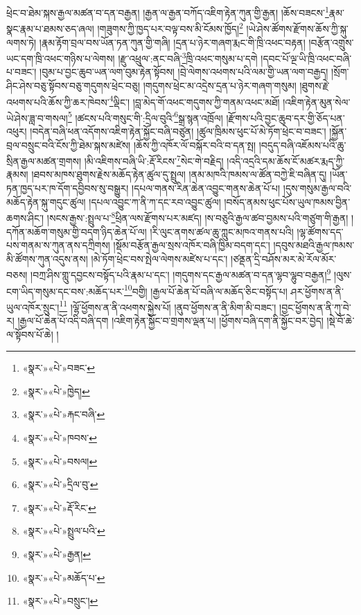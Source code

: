 ཕྲེང་བ་ཐེམ་སྐས་རྒྱལ་མཚན་བ་དན་བརྒྱན། །རྒྱན་ལ་རྒྱན་བཀོད་འཇིག་རྟེན་ཀུན་གྱི་རྒྱན། །ཆོས་བཟངས་\footnote{«སྣར་»«པེ་»བཟང་}རྣམ་སྣང་རྣམ་པ་ཐམས་ཅད་ཞལ། །གཟུགས་ཀྱི་ཁྱད་པར་བལྟ་བས་མི་ངོམས་ཁྱོད།\footnote{«སྣར་»«པེ་»ཁྱེད།} །ཡེ་ཤེས་ཚོགས་རྫོགས་ཆོས་ཀྱི་སྐུ་ལགས་ཏེ། །རྣམ་རྟོག་བྲལ་བས་ཡོན་ཏན་ཀུན་གྱི་གཞི། །དྲན་པ་ཉེར་གཞག་རྨང་གི་ཁྲི་འཕང་བརྟན། །བརྩོན་འགྲུས་ཡང་དག་ཁྲི་འཕང་གཉིས་པ་ལེགས། །རྫུ་འཕྲུལ་:ནང་བཞི་\footnote{«སྣར་»«པེ་»རྐང་བཞི་}ཁྲི་འཕང་གསུམ་པ་དགེ །དབང་པོ་ལྔ་ཡི་ཁྲི་འཕང་བཞི་པ་བཟང་། །བུམ་པ་བྱང་ཆུབ་ཡན་ལག་བུམ་རྟེན་སྟོབས། །བྲེ་ལེགས་འཕགས་པའི་ལམ་གྱི་ཡན་ལག་བརྒྱད། །སྲོག་ཤིང་ཤེས་བཅུ་སྟོབས་བཅུ་གདུགས་ཕྲེང་བཅུ། །གདུགས་ཕྲེང་མ་འདྲེས་དྲན་པ་ཉེར་གཞག་གསུམ། །ཐུགས་རྗེ་འཕགས་པའི་ཆོས་ཀྱི་ཆར་ཁེབས་\footnote{«སྣར་»«པེ་»ཁབས་}ལྡིང་། །བླ་མེད་གོ་འཕང་གདུགས་ཀྱི་གནམ་འཕང་མཐོ། །འཇིག་རྟེན་མུན་སེལ་ཡེ་ཤེས་ཟླ་བ་གསལ།\footnote{«སྣར་»«པེ་»བསལ།} །ཚངས་པའི་གསུང་གི་:དྲིལ་བུའི་\footnote{«སྣར་»«པེ་»དྲིལ་བུ་}སྒྲ་སྙན་འཁྲོལ། །རྫོགས་པའི་བྱང་ཆུབ་དར་གྱི་ཅོད་པན་འཕུར། །བདེན་བཞི་ཕན་འདོགས་འཇིག་རྟེན་སྐྱོང་བཞི་བཙུན། །ཚུལ་ཁྲིམས་ཕུང་པོ་མེ་ཏོག་ཕྲེང་བ་བཟང་། །སྐྱོན་བྲལ་བསྲུང་བའི་ངོས་ཀྱི་ཐེམ་སྐས་མཛེས། །ཆོས་ཀྱི་འཁོར་ལོ་བསྐོར་བའི་བ་དན་སྤ། །བདུད་བཞི་འཇོམས་པའི་ཆུ་སྲིན་རྒྱལ་མཚན་གྲགས། །མི་འཇིགས་བཞི་ཡི་:རྡོ་རིངས་\footnote{«སྣར་»«པེ་»རྡོ་རིང་}སེང་གེ་བརྗིད། །འདི་འདྲའི་དམ་ཆོས་ངོ་མཚར་རྨད་ཀྱི་རྣམས། །ཐབས་མཁས་ཐུགས་རྗེས་མཆོད་རྟེན་ཚུལ་དུ་སྤྲུལ། །ནམ་མཁའི་ཁམས་ལ་ཚོན་བཀྱེ་ཇི་བཞིན་དུ། །ཡོན་ཏན་ཁྱད་པར་ཁ་དོག་དབྱིབས་སུ་བསྒྱུར། །དཔལ་གནས་རིན་ཆེན་འབྱུང་གནས་ཆེན་པོ་པ། །དུས་གསུམ་རྒྱལ་བའི་མཆོད་རྟེན་སྐུ་གདུང་ཚུལ། །དཔལ་འབྱུང་ཀ་ནི་ཀ་དང་རབ་འབྱུང་ཚུལ། །བསོད་ནམས་ཕུང་པོས་ཡུལ་ཁམས་བྱིན་ཆགས་ཤིང་། །སངས་རྒྱས་:སྤྲུལ་པ་\footnote{«སྣར་»«པེ་»སྤྲུལ་པའི་}ཕྲིན་ལས་རྫོགས་པར་མཛད། །ས་བཅུའི་རྒྱལ་ཚབ་བྱམས་པའི་གཙུག་གི་རྒྱན། །དཀོན་མཆོག་གསུམ་གྱི་བདག་ཉིད་ཆེན་པོ་ལ། །རི་ལུང་ནགས་ཚལ་ཆུ་ཀླུང་མཁའ་གནས་པའི། །ལྷ་ཚོགས་དད་པས་གནམ་ས་ཀུན་ནས་དཀྲིགས། །སྡོམ་བརྩོན་རྒྱལ་སྲས་འཁོར་བཞི་ཁྱིམ་བདག་དང་། །དབུས་མཐའི་རྒྱལ་ཁམས་མི་ཚོགས་ཀུན་འདུས་ནས། །མེ་ཏོག་ཕྲེང་བས་སྤེལ་ལེགས་མཛེས་པ་དང་། །ཙནྡན་དྲི་བཤོས་མར་མེ་རོལ་མོར་བཅས། །བཀྲ་ཤིས་གླུ་དབྱངས་བསྟོད་པའི་རྣམ་པ་དང་། །གདུགས་དང་རྒྱལ་མཚན་བ་དན་ལྷབ་ལྷུབ་བརྒྱན།\footnote{«སྣར་»«པེ་»རྒྱན།} །ལུས་ངག་ཡིད་གསུམ་དང་བས་:མཆོད་པར་\footnote{«སྣར་»«པེ་»མཆོད་པ་}བགྱི། །རྒྱལ་པོ་ཆེན་པོ་བཞི་ལ་མཆོད་ཅིང་བསྟོད་པ། ཤར་ཕྱོགས་ན་ནི་ཡུལ་འཁོར་སྲུང་།\footnote{«སྣར་»«པེ་»བསྲུང་།} །ལྷོ་ཕྱོགས་ན་ནི་འཕགས་སྐྱེས་པོ། །ནུབ་ཕྱོགས་ན་ནི་མིག་མི་བཟང་། །བྱང་ཕྱོགས་ན་ནི་ཀུ་བེ་ར། །རྒྱལ་པོ་ཆེན་པོ་འདི་བཞི་དག །འཇིག་རྟེན་སྐྱོང་བ་གྲགས་ལྡན་པ། །ཕྱོགས་བཞི་དག་ནི་སྐྱོང་བར་བྱེད། །སྡེ་བོ་ཆེ་ལ་སྟོབས་པོ་ཆེ། །
